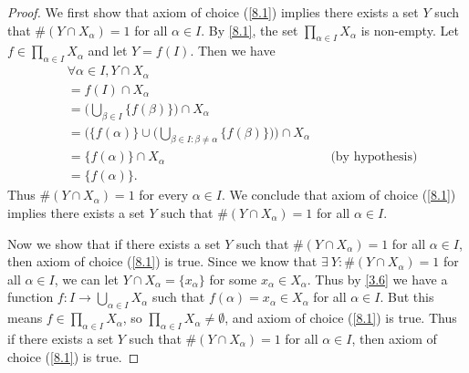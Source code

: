 \begin{proof}
  We first show that axiom of choice (\cref{8.1}) implies there exists a set \(Y\) such that \(\#(Y \cap X_{\alpha}) = 1\) for all \(\alpha \in I\).
  By \cref{8.1}, the set \(\prod_{\alpha \in I} X_{\alpha}\) is non-empty.
  Let \(f \in \prod_{\alpha \in I} X_{\alpha}\) and let \(Y = f(I)\).
  Then we have
  \begin{align*}
     & \forall \alpha \in I, Y \cap X_{\alpha}                                                                                                         \\
     & = f(I) \cap X_{\alpha}                                                                                                                          \\
     & = \Bigg(\bigcup_{\beta \in I} \{f(\beta)\}\Bigg) \cap X_{\alpha}                                                                                \\
     & = \Bigg(\{f(\alpha)\} \cup \bigg(\bigcup_{\beta \in I : \beta \neq \alpha} \{f(\beta)\}\bigg)\Bigg) \cap X_{\alpha}                             \\
     & = \{f(\alpha)\} \cap X_{\alpha}                                                                                     &  & \text{(by hypothesis)} \\
     & = \{f(\alpha)\}.
  \end{align*}
  Thus \(\#(Y \cap X_{\alpha}) = 1\) for every \(\alpha \in I\).
  We conclude that axiom of choice (\cref{8.1}) implies there exists a set \(Y\) such that \(\#(Y \cap X_{\alpha}) = 1\) for all \(\alpha \in I\).

  Now we show that if there exists a set \(Y\) such that \(\#(Y \cap X_{\alpha}) = 1\) for all \(\alpha \in I\), then axiom of choice (\cref{8.1}) is true.
  Since we know that \(\exists\ Y : \#(Y \cap X_{\alpha}) = 1\) for all \(\alpha \in I\), we can let \(Y \cap X_{\alpha} = \{x_{\alpha}\}\) for some \(x_{\alpha} \in X_{\alpha}\).
  Thus by \cref{3.6} we have a function \(f : I \to \bigcup_{\alpha \in I} X_{\alpha}\) such that \(f(\alpha) = x_{\alpha} \in X_{\alpha}\) for all \(\alpha \in I\).
  But this means \(f \in \prod_{\alpha \in I} X_{\alpha}\), so \(\prod_{\alpha \in I} X_{\alpha} \neq \emptyset\), and axiom of choice (\cref{8.1}) is true.
  Thus if there exists a set \(Y\) such that \(\#(Y \cap X_{\alpha}) = 1\) for all \(\alpha \in I\), then axiom of choice (\cref{8.1}) is true.
\end{proof}


